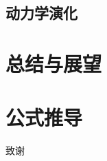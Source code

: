 \documentclass[type=bachelor]{fduthesis}
\begin{document}
\section{动力学演化}

\chapter{总结与展望}

\appendix

\chapter{公式推导}

\backmatter

\printbibliography

\begin{acknowledgements}
  致谢
\end{acknowledgements}
\end{document}
